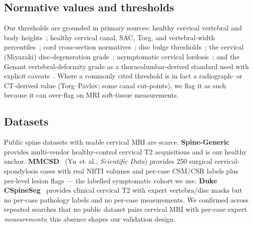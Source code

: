 \subsection{Normative values and thresholds}
Our thresholds are grounded in primary sources: healthy cervical vertebral \hahp{} and body
heights~\cite{tan2004,lee2012,kaur2025}; healthy cervical canal, SAC, Torg, and vertebral-width
percentiles~\cite{nell2019}; cord cross-section normatives~\cite{valosek2024}; disc bulge
thresholds~\cite{nakashima2015}; the cervical (Miyazaki) disc-degeneration grade~\cite{miyazaki2008};
asymptomatic cervical lordosis~\cite{nassj2025}; and the Genant vertebral-deformity grade as a
thoracolumbar-derived standard used with explicit caveats~\cite{genant1993}. Where a commonly cited
threshold is in fact a radiograph- or CT-derived value (Torg--Pavlov; some canal cut-points), we flag it
as such because it can over-flag on MRI soft-tissue measurements.

\subsection{Datasets}
Public spine datasets with usable cervical MRI are scarce. \textbf{Spine-Generic}~\cite{spinegeneric}
provides multi-vendor healthy-control cervical T2 acquisitions and is our healthy anchor.
\textbf{MMCSD}~\cite{mmcsd} (Yu~et~al., \emph{Scientific Data}) provides 250 surgical
cervical-spondylosis cases with real NIfTI volumes and per-case CSM/CSR labels plus per-level lesion
flags --- the labelled symptomatic cohort we use. \textbf{Duke CSpineSeg}~\cite{duke2025} provides
clinical cervical T2 with expert vertebra/disc masks but no per-case pathology labels and no per-case
measurements. We confirmed across repeated searches that no public dataset pairs cervical MRI with
per-case expert \emph{measurements}; this absence shapes our validation design.
